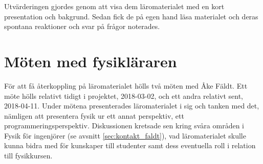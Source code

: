 Utvärderingen gjordes genom att visa dem läromaterialet med en kort
presentation och bakgrund. Sedan fick de på egen hand läsa materialet och deras
spontana reaktioner och svar på frågor noterades.

\section{Möten med fysikläraren}

För att få återkoppling på läromaterialet hölls två möten med Åke Fäldt. Ett möte hölls relativt
tidigt i projektet, 2018-03-02, och ett andra relativt sent, 2018-04-11.
Under mötena presenterades läromaterialet i sig och tanken med det, nämligen att
presentera fysik ur ett annat perspektiv, ett
programmeringsperspektiv. Diskussionen kretsade sen kring svåra områden i Fysik för
ingenjörer (se avsnitt \ref{sec:kontakt_faldt}), vad läromaterialet skulle kunna
bidra med för kunskaper till studenter samt dess eventuella roll i relation till
fysikkursen.
